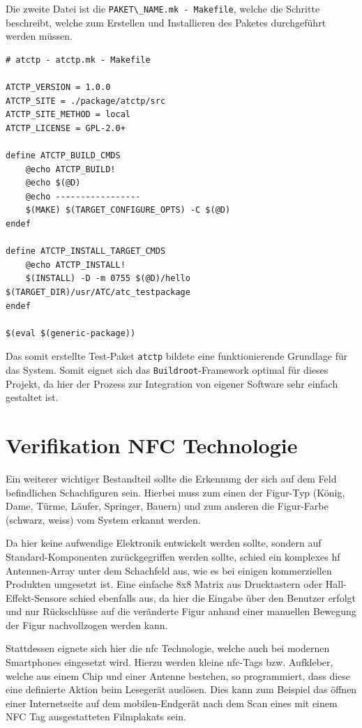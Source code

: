 Die zweite Datei ist die
\passthrough{\lstinline!PAKET\_NAME.mk - Makefile!}, welche die Schritte
beschreibt, welche zum Erstellen und Installieren des Paketes
durchgeführt werden müssen.

\begin{lstlisting}
# atctp - atctp.mk - Makefile

ATCTP_VERSION = 1.0.0
ATCTP_SITE = ./package/atctp/src
ATCTP_SITE_METHOD = local
ATCTP_LICENSE = GPL-2.0+

define ATCTP_BUILD_CMDS
    @echo ATCTP_BUILD!
    @echo $(@D)
    @echo -----------------
    $(MAKE) $(TARGET_CONFIGURE_OPTS) -C $(@D)
endef

define ATCTP_INSTALL_TARGET_CMDS
    @echo ATCTP_INSTALL!
    $(INSTALL) -D -m 0755 $(@D)/hello $(TARGET_DIR)/usr/ATC/atc_testpackage
endef

$(eval $(generic-package))
\end{lstlisting}

Das somit erstellte Test-Paket \passthrough{\lstinline!atctp!} bildete
eine funktionierende Grundlage für das System. Somit eignet sich das
\passthrough{\lstinline!Buildroot!}-Framework optimal für dieses
Projekt, da hier der Prozess zur Integration von eigener Software sehr
einfach gestaltet ist.

\hypertarget{verifikation-nfc-technologie}{%
\section{Verifikation NFC
Technologie}\label{verifikation-nfc-technologie}}

Ein weiterer wichtiger Bestandteil sollte die Erkennung der sich auf dem
Feld befindlichen Schachfiguren sein. Hierbei muss zum einen der
Figur-Typ (König, Dame, Türme, Läufer, Springer, Bauern) und zum anderen
die Figur-Farbe (schwarz, weiss) vom System erkannt werden.

Da hier keine aufwendige Elektronik entwickelt werden sollte, sondern
auf Standard-Komponenten zurückgegriffen werden sollte, schied ein
komplexes \gls{hf} Antennen-Array unter dem Schachfeld aus, wie es bei
einigen kommerziellen Produkten umgesetzt ist. Eine einfache 8x8 Matrix
aus Drucktastern oder Hall-Effekt-Sensore schied ebenfalls aus, da hier
die Eingabe über den Benutzer erfolgt und nur Rückschlüsse auf die
veränderte Figur anhand einer manuellen Bewegung der Figur nachvollzogen
werden kann.

Stattdessen eignete sich hier die \gls{nfc} Technologie, welche auch bei
modernen Smartphones eingesetzt wird. Hierzu werden kleine
\gls{nfc}-Tags bzw. Aufkleber, welche aus einem Chip und einer Antenne
bestehen, so programmiert, dass diese eine definierte Aktion beim
Lesegerät auslösen. Dies kann zum Beispiel das öffnen einer
Internetseite auf dem mobilen-Endgerät nach dem Scan eines mit einem NFC
Tag ausgestatteten Filmplakats sein.

